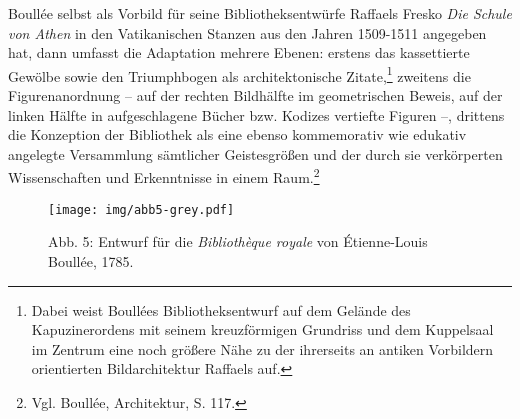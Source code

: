 Boullée selbst als Vorbild für seine Bibliotheksentwürfe Raffaels Fresko
\emph{Die Schule von Athen} in den Vatikanischen Stanzen aus den Jahren
1509-1511 angegeben hat, dann umfasst die Adaptation mehrere Ebenen:
erstens das kassettierte Gewölbe sowie den Triumphbogen als
architektonische Zitate,\footnote{Dabei weist Boullées
  Bibliotheksentwurf auf dem Gelände des Kapuzinerordens mit seinem
  kreuzförmigen Grundriss und dem Kuppelsaal im Zentrum eine noch
  größere Nähe zu der ihrerseits an antiken Vorbildern orientierten
  Bildarchitektur Raffaels auf.} zweitens die Figurenanordnung -- auf
der rechten Bildhälfte im geometrischen Beweis, auf der linken Hälfte in
aufgeschlagene Bücher bzw. Kodizes vertiefte Figuren --, drittens die
Konzeption der Bibliothek als eine ebenso kommemorativ wie edukativ
angelegte Versammlung sämtlicher Geistesgrößen und der durch sie
verkörperten Wissenschaften und Erkenntnisse in einem Raum.\footnote{Vgl.
  Boullée, Architektur, S. 117.}

\begin{figure}[htbp]
\centering
\texttt{[image: img/abb5-grey.pdf]}
\caption*{Abb. 5: Entwurf für die \emph{Bibliothèque royale} von
Étienne-Louis Boullée, 1785.}
\end{figure}

